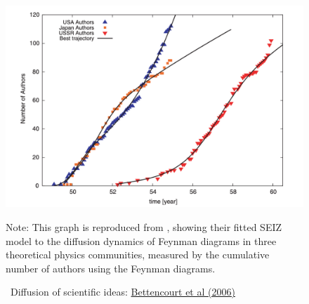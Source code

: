 	\begin{figure}[!ht] \centering  %
		\caption{ ~Diffusion of scientific ideas: \href{http://web.mit.edu/dikaiser/www/BAKC.PhysA.pdf}{Bettencourt et al (2006)}}\nocite{bettencourt2006power}
		\label{fig:science_ideas_curve}
		\centerline{\includegraphics[width=1.5\textwidth]{./figures/Feynman}}
		\begin{flushleft}{\footnotesize Note: This graph is reproduced from \cite{bettencourt2006power}, showing their fitted SEIZ model to the diffusion dynamics of Feynman diagrams in three theoretical physics communities, measured by the cumulative number of authors using the Feynman diagrams.}
		\end{flushleft}
	\end{figure}
